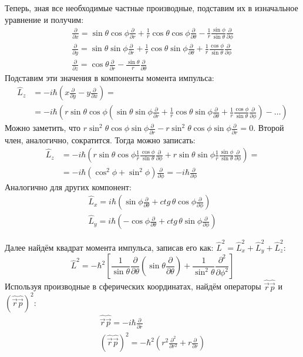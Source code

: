 Теперь, зная все необходимые частные производные, подставим их в изначальное уравнение и получим:
\begin{gather*}
\frac{\partial }{\partial x} = \sin\theta\cos\phi\frac{\partial}{\partial r} + \frac{1}{r}\cos\theta\cos\phi\frac{\partial}{\partial \theta} -\frac{1}{r}\frac{\sin\phi}{\sin\theta}\frac{\partial}{\partial\phi}\\
\frac{\partial }{\partial y} = \sin\theta\sin\phi\frac{\partial}{\partial r} + \frac{1}{r}\cos\theta\sin\phi\frac{\partial}{\partial \theta} +\frac{1}{r}\frac{\cos\phi}{\sin\theta}\frac{\partial}{\partial\phi}\\
\frac{\partial }{\partial z} = \cos\theta\frac{\partial}{\partial r} -\frac{\sin\theta}{r}\frac{\partial}{\partial \theta}
\end{gather*}
Подставим эти значения в компоненты момента импульса:
\begin{align*}
\hat{L}_z &= -i\hbar(x\frac{\partial}{\partial y} - y\frac{\partial}{\partial x}) =\\
&= -i\hbar\left(r\sin\theta\cos\phi\left(\sin\theta\sin\phi\frac{\partial}{\partial r} + \frac{1}{r}\cos\theta\sin\phi\frac{\partial}{\partial \theta} +\frac{1}{r}\frac{\cos\phi}{\sin\theta}\frac{\partial}{\partial\phi}\right) - \dots \right)
\end{align*}
Можно заметить, что $r\sin^2\theta \cos\phi \sin\phi \frac{\partial}{\partial r} - r\sin^2\theta\cos\phi\sin\phi\frac{\partial}{\partial r} = 0$. Второй член, аналогично, сократится. Тогда можно записать:
\begin{align*}
    \hat{L}_z &= -i\hbar\left(r\sin\theta\cos\phi\frac{1}{r}\frac{\cos\phi}{\sin\theta}\frac{\partial}{\partial \phi} + r\sin\theta\sin\phi\frac{1}{r}\frac{\sin\phi}{\sin\theta}\frac{\partial}{\partial \phi} \right) =\\ 
    &= -i\hbar \left(\cos^2\phi+\sin^2\phi\right)\frac{\partial}{\partial \phi} = -i\hbar\frac{\partial}{\partial \phi}
\end{align*}
Аналогично для других компонент:
\begin{gather*}
\hat{L}_x = i\hbar\left(\sin\phi\frac{\partial}{\partial \theta} + ctg\,\theta\cos\phi \frac{\partial}{\partial \phi}\right)\\
\hat{L}_y = i\hbar\left(-\cos\phi\frac{\partial}{\partial \theta} + ctg\,\theta\sin\phi \frac{\partial}{\partial \phi}\right)
\end{gather*}

Далее найдём квадрат момента импульса, записав его как: $\hat{L}^2 = \hat{L}^2_x + \hat{L}^2_y + \hat{L}^2_z$:
\[
\hat{L}^2 = -\hbar^2\left[\frac{1}{\sin\theta}\frac{\partial}{\partial \theta}\left( \sin\theta\frac{\partial}{\partial \theta} \right) + \frac{1}{\sin^2\theta}\frac{\partial^2}{\partial\phi^2}\right]
\]
Используя производные в сферических координатах, найдём операторы $\hat{\Vec{r}}\hat{\Vec{p}}$ и $(\hat{\Vec{r}}\hat{\Vec{p}})^2$:
\begin{gather*}
\hat{\Vec{r}}\hat{\Vec{p}} = -i\hbar\frac{\partial}{\partial r}\\
(\hat{\Vec{r}}\hat{\Vec{p}})^2 = -\hbar^2\left( r^2\frac{\partial^2}{\partial r^2} + r\frac{\partial}{\partial r}\right)
\end{gather*}

